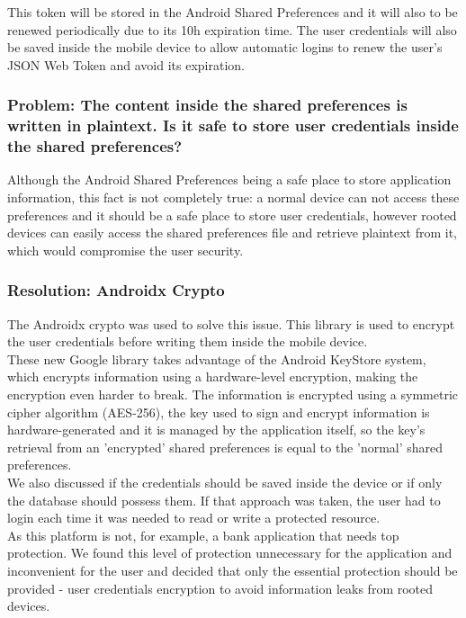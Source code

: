 This token will be stored in the Android Shared Preferences\cite{sharedpreferences} and it will also to be renewed periodically due to its 10h expiration time. The user credentials will also be saved
inside the mobile device to allow automatic logins to renew the user's JSON Web Token and avoid its expiration.\\

\subsubsection{Problem: The content inside the shared preferences is written in plaintext. Is it safe to store user credentials inside the shared preferences?}

Although the Android Shared Preferences being a safe place to store application information, this fact is not completely true:
a normal device can not access these preferences and it should be a safe place to store user credentials, however rooted devices\cite{root} can easily
access the shared preferences file and retrieve plaintext from it, which would compromise the user security.\\

\subsubsection{Resolution: Androidx Crypto}

The Androidx crypto\cite{crypto} was used to solve this issue. This library is used to encrypt the user credentials before writing them inside the mobile device.\\

These new Google library takes advantage of the Android KeyStore\cite{keystore} system, which encrypts information using a hardware-level encryption, making the
encryption even harder to break. The information is encrypted using a symmetric cipher algorithm (AES-256), the key used to sign and encrypt information
is hardware-generated and it is managed by the application itself, so the key's retrieval from an 'encrypted' shared preferences is equal to the 'normal'
shared preferences.\\

We also discussed if the credentials should be saved inside the device or if only the database should possess them.
If that approach was taken, the user had to login each time it was needed to read or write a protected resource.\\

As this platform is not, for example, a bank application that needs top protection. We found this level of protection
unnecessary for the application and inconvenient for the user and decided that only the essential protection should be provided - 
user credentials encryption to avoid information leaks from rooted devices.

